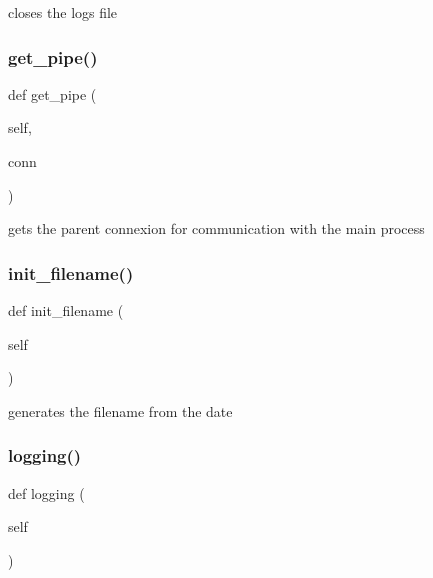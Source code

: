 \begin{DoxyVerb}closes the logs file\end{DoxyVerb}
 \mbox{\label{classjson_logs_1_1json_logs_a80a87c5b622ec948e52d1bbd467a5f7f}} 
\subsubsection{\texorpdfstring{get\+\_\+pipe()}{get\_pipe()}}
{\footnotesize\ttfamily def get\+\_\+pipe (\begin{DoxyParamCaption}\item[{}]{self,  }\item[{}]{conn }\end{DoxyParamCaption})}

\begin{DoxyVerb}gets the parent connexion for communication with the main process\end{DoxyVerb}
 \mbox{\label{classjson_logs_1_1json_logs_ab81dff542da19a7c4efea4c4111660c7}} 
\subsubsection{\texorpdfstring{init\+\_\+filename()}{init\_filename()}}
{\footnotesize\ttfamily def init\+\_\+filename (\begin{DoxyParamCaption}\item[{}]{self }\end{DoxyParamCaption})}

\begin{DoxyVerb}generates the filename from the date\end{DoxyVerb}
 \mbox{\label{classjson_logs_1_1json_logs_a2f88c2aa4847cb5f1f57b49dc0e1794a}} 
\subsubsection{\texorpdfstring{logging()}{logging()}}
{\footnotesize\ttfamily def logging (\begin{DoxyParamCaption}\item[{}]{self }\end{DoxyParamCaption})}

